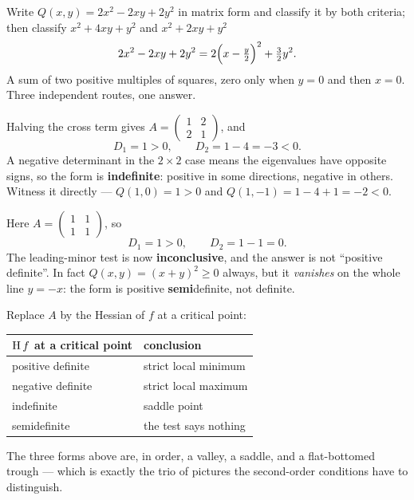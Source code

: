 \begin{worked}{Write $Q(x,y)=2x^{2}-2xy+2y^{2}$ in matrix form and classify it by both criteria; then classify $x^{2}+4xy+y^{2}$ and $x^{2}+2xy+y^{2}$}
\[
  2x^{2}-2xy+2y^{2}
  =2\Bigl(x-\tfrac{y}{2}\Bigr)^{2}+\tfrac32 y^{2} .
\]
A sum of two positive multiples of squares, zero only when $y=0$ and then
$x=0$. Three independent routes, one answer.

Halving the cross term gives
$A=\begin{pmatrix}1&2\\2&1\end{pmatrix}$, and
\[
  D_{1}=1>0,\qquad D_{2}=1-4=-3<0 .
\]
A negative determinant in the $2\times2$ case means the eigenvalues have
opposite signs, so the form is \textbf{indefinite}: positive in some
directions, negative in others. Witness it directly --- $Q(1,0)=1>0$ and
$Q(1,-1)=1-4+1=-2<0$.

Here $A=\begin{pmatrix}1&1\\1&1\end{pmatrix}$, so
\[
  D_{1}=1>0,\qquad D_{2}=1-1=0 .
\]
The leading-minor test is now \textbf{inconclusive}, and the answer is not
``positive definite''. In fact $Q(x,y)=(x+y)^{2}\ge0$ always, but it
\emph{vanishes} on the whole line $y=-x$: the form is positive
\textbf{semi}definite, not definite.

Replace $A$ by the Hessian of $f$ at a critical point:
\begin{center}\footnotesize
\begin{tabular}{ll}
  \hline
  $\operatorname{H} f$ at a critical point & conclusion\\
  \hline
  positive definite & strict local minimum\\
  negative definite & strict local maximum\\
  indefinite & saddle point\\
  semidefinite & the test says nothing\\
  \hline
\end{tabular}
\end{center}
The three forms above are, in order, a valley, a saddle, and a flat-bottomed
trough --- which is exactly the trio of pictures the second-order conditions
have to distinguish.
\end{worked}

